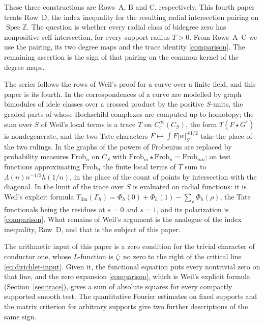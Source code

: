\documentclass[10pt]{amsart}
\theoremstyle{definition}
\theoremstyle{remark}
\begin{document}
These three constructions are Rows~A, B and C, respectively.
This fourth paper treats Row~D, the index inequality for the resulting
radial intersection pairing on $\operatorname{Spec}\mathbb Z$.
The question is whether every radial class of bidegree zero has nonpositive
self-intersection, for every support radius $T>0$. From Rows~A--C
we use the pairing, its two degree maps and the trace identity
\eqref{comparison}. The remaining assertion is the sign of that
pairing on the common kernel of the degree maps.

The series follows the rows of Weil's proof for a curve over a finite
field, and this paper is its fourth. In \cite{P43} the correspondences
of a curve are modelled by graph bimodules of idele classes over a crossed
product by the positive $S$-units, the graded parts of whose Hochschild
complexes are computed up to homotopy; the sum over $S$ of Weil's local terms is a trace $T$ on
$C_c^\infty(C_S)$, the form $T(F\star G^\dagger)$ is nondegenerate, and the
two Tate characters $F\mapsto\int F|w|_S^{\mp1/2}$ take the place of the two
rulings. In \cite{P44} the graphs of the powers of Frobenius are replaced by
probability measures $\mathrm{Frob}_n$ on $C_S$ with
$\mathrm{Frob}_m\star\mathrm{Frob}_n=\mathrm{Frob}_{mn}$; on test functions
approximating $\mathrm{Frob}_n$ the finite local terms of $T$ sum to
$\Lambda(n)n^{-1/2}h(1/n)$, in the place of the count of points by
intersection with the diagonal. In \cite{Paper45} the limit of the trace
over $S$ is evaluated on radial functions: it is Weil's explicit formula
$T_{\lim}(\Gamma_h)=\Phi_h(0)+\Phi_h(1)-\sum_\rho\Phi_h(\rho)$, the Tate
functionals being the residues at $s=0$ and $s=1$, and its polarization is
\eqref{comparison}. What remains of Weil's argument is the analogue of the
index inequality, Row~D, and that is the subject of this paper.

The arithmetic input of this paper is a zero condition for the trivial
character of conductor one, whose $L$-function is $\zeta$: no zero to
the right of the critical line \eqref{eq:dirichlet-input}. Given it, the
functional equation puts every nontrivial zero on that line, and the zero
expansion \eqref{comparison}, which is Weil's explicit formula
(Section~\ref{sec:trace}), gives a sum of absolute squares for every compactly
supported smooth test. The quantitative Fourier estimates on
fixed supports and the matrix criterion for arbitrary supports give
two further descriptions of the same sign.
\end{document}
